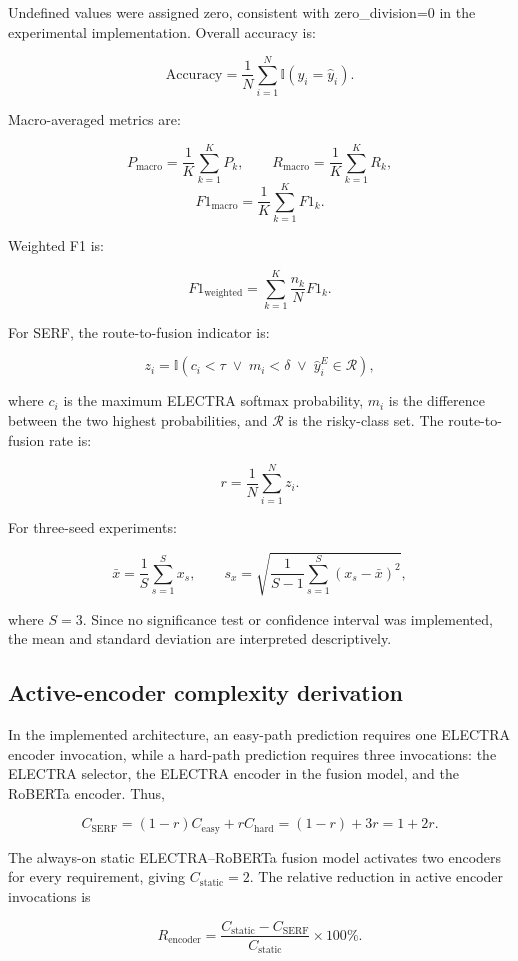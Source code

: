 \documentclass[runningheads]{llncs}
\begin{document}
Undefined values were assigned zero, consistent with zero\_division=0 in the experimental implementation. Overall accuracy is:

\[ \mathrm{Accuracy} =\frac{1}{N}\sum_{i=1}^{N}\mathbb{I}(y_i=\hat{y}_i). \]

Macro-averaged metrics are:

\[ P_{\mathrm{macro}}=\frac{1}{K}\sum_{k=1}^{K}P_k,\qquad R_{\mathrm{macro}}=\frac{1}{K}\sum_{k=1}^{K}R_k, \]\[ F1_{\mathrm{macro}}=\frac{1}{K}\sum_{k=1}^{K}F1_k. \]

Weighted F1 is:

\[ F1_{\mathrm{weighted}} =\sum_{k=1}^{K}\frac{n_k}{N}F1_k. \]

For SERF, the route-to-fusion indicator is:

\[ z_i=\mathbb{I}\left( c_i<\tau\;\lor\; m_i<\delta\;\lor\; \hat{y}^{E}_i\in\mathcal{R} \right), \]

where \(c_i\) is the maximum ELECTRA softmax probability, \(m_i\) is the difference between the two highest probabilities, and \(\mathcal{R}\) is the risky-class set. The route-to-fusion rate is:

\[ r=\frac{1}{N}\sum_{i=1}^{N}z_i. \]

For three-seed experiments:

\[ \bar{x}=\frac{1}{S}\sum_{s=1}^{S}x_s,\qquad s_x=\sqrt{\frac{1}{S-1}\sum_{s=1}^{S}(x_s-\bar{x})^2}, \]

where \(S=3\). Since no significance test or confidence interval was implemented, the mean and standard deviation are interpreted descriptively.

\subsection*{Active-encoder complexity derivation}

In the implemented architecture, an easy-path prediction requires one ELECTRA encoder invocation, while a hard-path prediction requires three invocations: the ELECTRA selector, the ELECTRA encoder in the fusion model, and the RoBERTa encoder. Thus,

\[C_{\mathrm{SERF}}=(1-r)C_{\mathrm{easy}}+rC_{\mathrm{hard}}=(1-r)+3r=1+2r.\]

The always-on static ELECTRA--RoBERTa fusion model activates two encoders for every requirement, giving \(C_{\mathrm{static}}=2\). The relative reduction in active encoder invocations is

\[R_{\mathrm{encoder}}=\frac{C_{\mathrm{static}}-C_{\mathrm{SERF}}}{C_{\mathrm{static}}}\times100\%.\]
\end{document}
